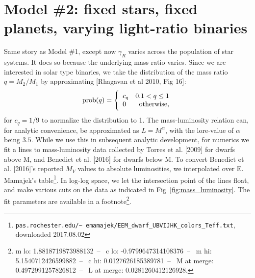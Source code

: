 \documentclass{emulateapj}
\begin{document}
\section{Model \#2: fixed stars, fixed planets, varying light-ratio binaries}
\label{sec:model_2}

Same story as Model \#1, except now $\gamma_R$ varies across the population 
of star systems.
It does so because the underlying mass ratio varies. 
Since we are interested in solar type binaries, we take the distribution of the 
mass ratio $q=M_2/M_1$ by approximating [Rhagavan et al 2010, Fig 16]:
\begin{equation}
{\rm prob}(q) =
\Bigg\{\begin{array}{lr}
c_q & 0.1 < q \leq 1  \\
0 & {\rm otherwise},
\end{array}
\label{eq:mass_ratio}
\end{equation}
for $c_q = 1/9$ to normalize the distribution to 1.
The mass-luminosity relation can, for analytic convenience, be approximated as 
$L = M^\alpha$, with the lore-value of $\alpha$ being $3.5$.
While we use this in subsequent analytic development, for numerics we fit a 
lines to mass-luminosity data collected by Torres et al. [2009] for 
dwarfs above M, and Benedict et al. [2016] for dwarfs below M.
To convert Benedict et al. [2016]'s reported $M_V$ values to absolute 
luminosities, we interpolated over E. Mamajek's 
table\footnote{
	\texttt{pas.rochester.edu/\textasciitilde 
		emamajek/EEM\_dwarf\_UBVIJHK\_colors\_Teff.txt},
	downloaded 2017.08.02}.
In log-log space, we let the intersection point of the lines float, and make 
various cuts on the data as indicated in Fig~\ref{fig:mass_luminosity}. The 
fit parameters are available in a footnote\footnote{
	m lo: 1.8818719873988132~--~
	c lo: -0.9799647314108376~--~
	m hi: 5.1540712426599882~--~
	c hi: 0.0127626185389781~--~
	M at merge: 0.4972991257826812~--~
	L at merge: 0.0281260412126928.
}.
\end{document}

